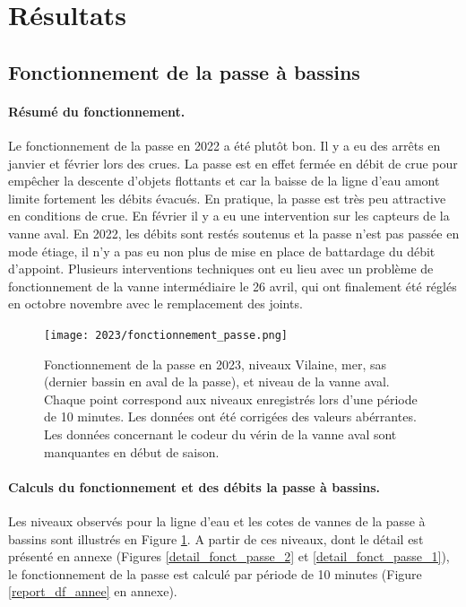 \documentclass[11pt,twocolumn,titlepage,twoside]{article}\usepackage[]{graphicx}\usepackage[]{color}
\begin{document}
\section{Résultats}
\subsection{Fonctionnement de la passe à bassins}
\paragraph{Résumé du fonctionnement.}

Le fonctionnement de la passe en 2022 a été plutôt bon. Il y a eu des arrêts en
janvier et février lors des crues. La passe est en effet fermée
en débit de crue pour empêcher la descente d'objets flottants et car la baisse
de la ligne d'eau amont limite fortement les débits évacués. En pratique, la
passe est très peu attractive en conditions de crue. En février il y a eu une
intervention sur les capteurs de la vanne aval. En 2022, les débits sont restés soutenus et la passe n'est pas passée en
mode étiage, il n'y a pas eu non plus de mise en place de battardage du débit
d'appoint.
Plusieurs interventions techniques ont eu lieu avec un problème de
fonctionnement de la vanne intermédiaire le 26 avril, qui ont finalement été
réglés en octobre novembre avec le remplacement des joints.

\begin{figure}[htpb]
\centering
\texttt{[image: 2023/fonctionnement\_passe.png]}
\caption{Fonctionnement de la passe en 2023, niveaux Vilaine, mer, sas
(dernier bassin en aval de la passe), et niveau de la vanne aval. Chaque point correspond aux niveaux
enregistrés lors d'une période de 10 minutes. Les données ont été corrigées des
valeurs abérrantes. Les données concernant le codeur du vérin de la vanne aval
sont manquantes en début de saison.}
\label{figure_fonctionnement_passe}
\end{figure}

\paragraph{Calculs du fonctionnement et des débits la passe à bassins.}
Les niveaux observés pour la ligne d'eau et les cotes de vannes de la passe
à bassins sont illustrés en Figure \ref{figure_fonctionnement_passe}. A
partir de ces niveaux, dont le détail est présenté en annexe (Figures
\ref{detail_fonct_passe_2} et \ref{detail_fonct_passe_1}), le fonctionnement
de la passe est calculé par période de 10 minutes (Figure \ref{report_df_annee}
en annexe).
\end{document}

